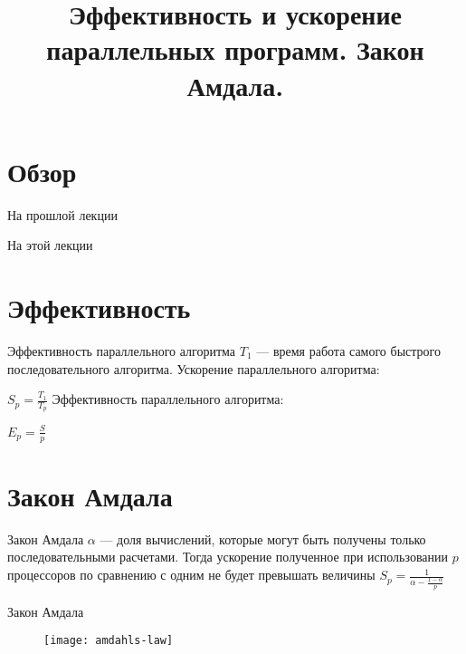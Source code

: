

\title{Эффективность и ускорение параллельных программ. Закон Амдала.}



\begin{frame}
\titlepage
\end{frame}

\section*{Обзор}

\begin{frame}{На прошлой лекции}
\end{frame}

\begin{frame}{На этой лекции}
\tableofcontents
\end{frame}

\section{Эффективность}

\begin{frame}{Эффективность параллельного алгоритма}
$T_1$ --- время работа самого быстрого последовательного алгоритма.
\vfill
Ускорение параллельного алгоритма:

$S_p = \frac{T_1}{T_p}$
\vfill
Эффективность параллельного алгоритма:

$E_p = \frac{S}{p}$
\end{frame}

\section{Закон Амдала}

\begin{frame}{Закон Амдала}
$\alpha$ --- доля вычислений, которые могут быть получены только
последовательными расчетами.
\vfill
Тогда ускорение полученное при использовании $p$ процессоров по сравнению с
одним не будет превышать величины
\vfill
$S_p =\frac{1}{\alpha - \frac{1 - \alpha}{p}}$
\end{frame}

\begin{frame}{Закон Амдала}
\begin{figure}
    \centering
    \texttt{[image: amdahls-law]}
\end{figure}
\end{frame}

